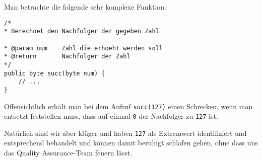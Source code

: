 \documentclass{abgabe}
\begin{document}
\begin{questions}
\begin{parts}
\begin{solution}
            Man betrachte die folgende sehr komplexe Funktion:
            \begin{lstlisting}
/* 
* Berechnet den Nachfolger der gegeben Zahl

* @param num    Zahl die erhoeht werden soll
* @return       Nachfolger der Zahl
*/
public byte succ(byte num) {
    // ... 
}
            \end{lstlisting}

            Offensichtlich erhält man bei dem Aufruf \texttt{succ(127)} einen Schrecken, wenn man entsetzt feststellen muss, dass auf einmal \texttt{0} der Nachfolger zu \texttt{127} ist.

            Natürlich sind wir aber klüger und haben \texttt{127} als Extremwert identifiziert und entsprechend behandelt und können damit beruhigt schlafen gehen, ohne dass uns das Quality Assurance-Team feuern lässt.
        \end{solution}
    \end{parts}
\end{questions}
\end{document}
